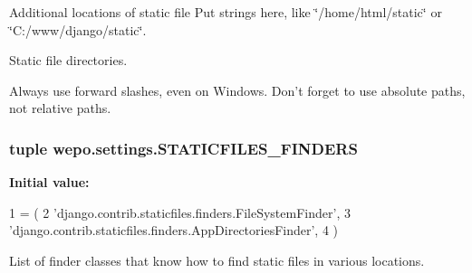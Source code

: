 Additional locations of static file Put strings here, like \char`\"{}/home/html/static\char`\"{} or \char`\"{}\-C\-:/www/django/static\char`\"{}. 

Static file directories.

Always use forward slashes, even on Windows. Don't forget to use absolute paths, not relative paths. \hypertarget{namespacewepo_1_1settings_adba3f172a0e5080586dc8a88f1918290}{
\subsubsection[{S\-T\-A\-T\-I\-C\-F\-I\-L\-E\-S\-\_\-\-F\-I\-N\-D\-E\-R\-S}]{\setlength{\rightskip}{0pt plus 5cm}tuple wepo.\-settings.\-S\-T\-A\-T\-I\-C\-F\-I\-L\-E\-S\-\_\-\-F\-I\-N\-D\-E\-R\-S}}\label{namespacewepo_1_1settings_adba3f172a0e5080586dc8a88f1918290}
{\bfseries Initial value\-:}
\begin{DoxyCode}
1 = (
2    \textcolor{stringliteral}{'django.contrib.staticfiles.finders.FileSystemFinder'},
3    \textcolor{stringliteral}{'django.contrib.staticfiles.finders.AppDirectoriesFinder'},
4 )
\end{DoxyCode}


List of finder classes that know how to find static files in various locations. 

